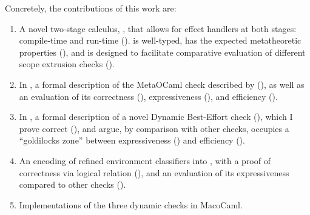 Concretely, the contributions of this work are:
\begin{enumerate}
    \item A novel two-stage calculus, \calculusName{}, that allows for effect handlers at both stages: compile-time and run-time (). \calculusName{} is well-typed, has the expected metatheoretic properties (), and is designed to facilitate comparative evaluation of different scope extrusion checks ().
    \item In \calculusName{}, a formal description of the MetaOCaml check described by \citet{kiselyov-14} (), as well as an evaluation of its correctness (), expressiveness (), and efficiency ().
    \item In \calculusName{}, a formal description of a novel Dynamic Best-Effort check (), which I prove correct (), and argue, by comparison with other checks, occupies a ``goldilocks zone'' between expressiveness () and efficiency (). 
    \item An encoding of refined environment classifiers \citep{kiselyov-16} into \calculusName{}, with a proof of correctness via logical relation (), and an evaluation of its expressiveness compared to other checks ().
    \item Implementations of the three dynamic checks in MacoCaml.
\end{enumerate}

